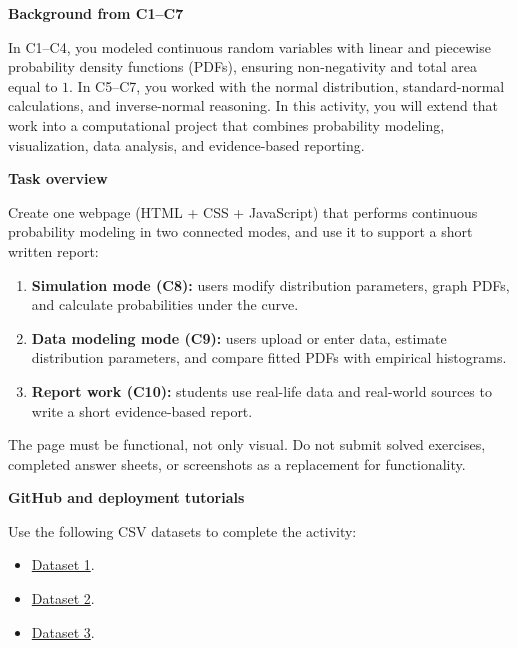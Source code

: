 \documentclass[12pt]{article}
\newcommand{\SubsectionBox}[1]{%
	\noindent\colorbox{gray!30}{%
		\parbox{\linewidth}{\textbf{#1}}%
	}\par\vspace{0.35cm}%
}
\begin{document}
	\vspace{0.25cm}
	
	\SubsectionBox{Background from C1--C7}
	In C1--C4, you modeled continuous random variables with linear and piecewise probability density functions (PDFs), ensuring non-negativity and total area equal to \(1\). In C5--C7, you worked with the normal distribution, standard-normal calculations, and inverse-normal reasoning. In this activity, you will extend that work into a computational project that combines probability modeling, visualization, data analysis, and evidence-based reporting.
	
	\SubsectionBox{Task overview}
	Create one webpage (HTML + CSS + JavaScript) that performs continuous probability modeling in two connected modes, and use it to support a short written report:
	\begin{enumerate}
		\item \textbf{Simulation mode (C8):} users modify distribution parameters, graph PDFs, and calculate probabilities under the curve.
		\item \textbf{Data modeling mode (C9):} users upload or enter data, estimate distribution parameters, and compare fitted PDFs with empirical histograms.
		\item \textbf{Report work (C10):} students use real-life data and real-world sources to write a short evidence-based report.
	\end{enumerate}
	The page must be functional, not only visual. Do not submit solved exercises, completed answer sheets, or screenshots as a replacement for functionality.
	
	\SubsectionBox{GitHub and deployment tutorials}
	\noindent{}
	
		\vspace{0.35cm}
	
	Use the following CSV datasets to complete the activity:
	\begin{itemize}
		\item \href{https://correosanbartoloedu-my.sharepoint.com/:x:/g/personal/nicolas_lopez_sanbartolo_edu_co/IQCYNF1OE20rQLJqdJg3pzpfAQv1u6tDoW0kHBnX_LXwtYA?e=n76GM0}{Dataset 1}.
		\item \href{https://correosanbartoloedu-my.sharepoint.com/:x:/g/personal/nicolas_lopez_sanbartolo_edu_co/IQDazlshOg4TTorNVkrNv-bpAZEx2g3iqoL47Qz7KynYDV4?e=Nokc5D}{Dataset 2}.
		\item \href{https://correosanbartoloedu-my.sharepoint.com/:x:/g/personal/nicolas_lopez_sanbartolo_edu_co/IQAYBCT4Te-1Q5f6x_dp7phTAdMpBwr0scWLBGOHqnfJxiM?e=LQzlHe}{Dataset 3}.
	\end{itemize}
	
\end{document}

